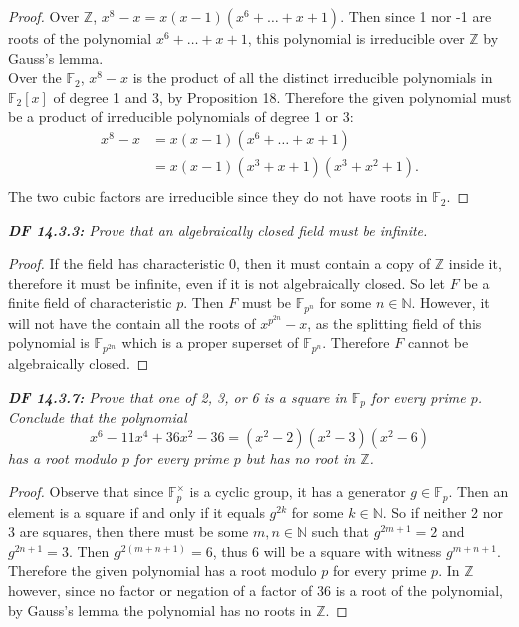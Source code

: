 \documentclass{article}
\begin{document}
  \begin{proof}
    Over $\mathbb{Z}$, $x^8-x =x(x-1)(x^6+\ldots+x+1)$. Then since 1 nor -1
    are roots of the polynomial $x^6+\ldots+x+1$, this polynomial is
    irreducible over $\mathbb{Z}$ by Gauss's lemma. \\

    Over the $\mathbb{F}_2$, $x^8-x$ is the product of all the distinct
    irreducible polynomials in $\mathbb{F}_2[x]$ of degree 1 and 3, by
    Proposition 18. Therefore the given polynomial must be a product of
    irreducible polynomials of degree 1 or 3:
    \begin{align*}
      x^8-x &=x(x-1)(x^6+\ldots+x+1)\\
      &=x(x-1)(x^3+x+1)(x^3+x^2+1).\\
    \end{align*}
    The two cubic factors are irreducible since they do not have roots in
    $\mathbb{F}_2$.
  \end{proof}

\it \textbf{DF 14.3.3:} Prove that an algebraically closed field must be
  infinite.

  \begin{proof}
    If the field has characteristic 0, then it must contain a copy of
    $\mathbb{Z}$ inside it, therefore it must be infinite, even if it is
    not algebraically closed. So let $F$ be a finite field of
    characteristic $p$. Then $F$ must be $\mathbb{F}_{p^n}$ for some
    $n\in\mathbb{N}$. However, it will not have the contain all the roots
    of $x^{p^{2n}}-x$, as the splitting field of this polynomial is
    $\mathbb{F}_{p^{2n}}$ which is a proper superset of $\mathbb{F}_{p^n}$.
    Therefore $F$ cannot be algebraically closed.
  \end{proof}

\it \textbf{DF 14.3.7:} Prove that one of 2, 3, or 6 is a square in
  $\mathbb{F}_p$ for every prime $p$. Conclude that the polynomial
  \[x^6-11x^4+36x^2-36 =(x^2-2)(x^2-3)(x^2-6)\]
  has a root modulo $p$ for every prime $p$ but has no root in
  $\mathbb{Z}$.

  \begin{proof}
    Observe that since $\mathbb{F}_p^\times$ is a cyclic group, it has a
    generator $g\in\mathbb{F}_p$. Then an element is a square if and only
    if it equals $g^{2k}$ for some $k\in\mathbb{N}$. So if neither 2 nor 3
    are squares, then there must be some $m,n\in\mathbb{N}$ such that
    $g^{2m+1}=2$ and $g^{2n+1}=3$. Then $g^{2(m+n+1)}=6$, thus 6 will be
    a square with witness $g^{m+n+1}$. \\

    Therefore the given polynomial has a root modulo $p$ for every prime
    $p$. In $\mathbb{Z}$ however, since no factor or negation of a factor
    of 36 is a root of the polynomial, by Gauss's lemma the polynomial has
    no roots in $\mathbb{Z}$.
  \end{proof}
\end{document}
